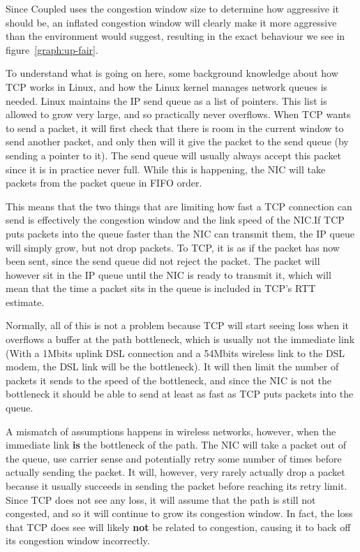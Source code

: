 Since Coupled uses the congestion window size to determine how aggressive it
should be, an inflated congestion window will clearly make it more aggressive
than the environment would suggest, resulting in the exact behaviour we see in
figure~\ref{graph:up-fair}.

To understand what is going on here, some background knowledge about how TCP
works in Linux, and how the Linux kernel manages network queues is needed. Linux
maintains the IP send queue as a list of pointers. This list is allowed to grow
very large, and so practically never overflows. When TCP wants to send a packet,
it will first check that there is room in the current window to send another
packet, and only then will it give the packet to the send queue (by sending a
pointer to it). The send queue will usually always accept this packet since it
is in practice never full. While this is happening, the NIC will take packets
from the packet queue in FIFO order.

This means that the two things that are limiting how fast a TCP connection can
send is effectively the congestion window and the link speed of the NIC.\@ If
TCP puts packets into the queue faster than the NIC can transmit them, the IP
queue will simply grow, but not drop packets. To TCP, it is as if the packet has
now been sent, since the send queue did not reject the packet. The packet will
however sit in the IP queue until the NIC is ready to transmit it, which will
mean that the time a packet sits in the queue is included in TCP's RTT estimate.

Normally, all of this is not a problem because TCP will start seeing loss when
it overflows a buffer at the path bottleneck, which is usually not the immediate
link (With a 1Mbits uplink DSL connection and a 54Mbits wireless link to the DSL
modem, the DSL link will be the bottleneck). It will then limit the number of
packets it sends to the speed of the bottleneck, and since the NIC is not the
bottleneck it should be able to send at least as fast as TCP puts packets into
the queue.

A mismatch of assumptions happens in wireless networks, however, when the
immediate link \textbf{is} the bottleneck of the path. The NIC will take a
packet out of the queue, use carrier sense and potentially retry some number of
times before actually sending the packet. It will, however, very rarely actually
drop a packet because it usually succeeds in sending the packet before reaching
its retry limit. Since TCP does not see any loss, it will assume that the path
is still not congested, and so it will continue to grow its congestion window.
In fact, the loss that TCP does see will likely \textbf{not} be related to
congestion, causing it to back off its congestion window incorrectly.

